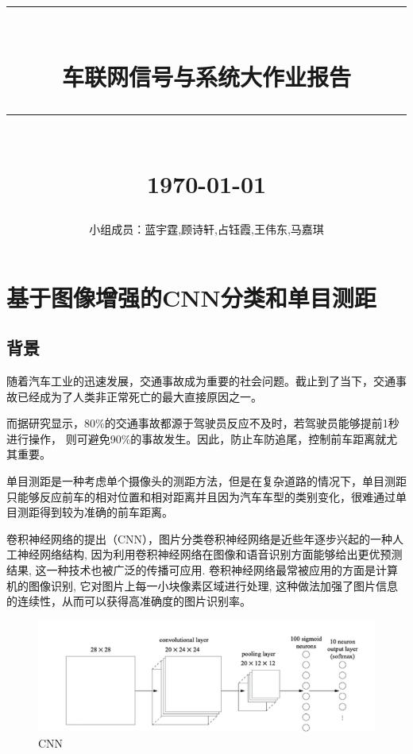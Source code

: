 \documentclass[12pt]{report}
\newcommand{\HRule}[1]{\rule{\linewidth}{#1}}
\begin{document}
\large

\title{ \normalsize \textsc{}
        \\ [2.0cm]
        \HRule{0.5pt} \\
        \LARGE \textbf{\uppercase{车联网信号与系统大作业报告}}
        \HRule{2pt} \\ [0.5cm]
        \normalsize \today \vspace*{5\baselineskip}}

\date{}

\author{
        小组成员：蓝宇霆,顾诗轩,占钰霞,王伟东,马嘉琪\\
        }

\maketitle
\tableofcontents
\newpage

\sectionfont{\scshape}


\section{基于图像增强的CNN分类和单目测距
}
\subsection{背景}
随着汽车工业的迅速发展，交通事故成为重要的社会问题。截止到了当下，交通事故已经成为了人类非正常死亡的最大直接原因之一。

而据研究显示，80\%的交通事故都源于驾驶员反应不及时，若驾驶员能够提前1秒进行操作，
则可避免90\%的事故发生。因此，防止车防追尾，控制前车距离就尤其重要。

单目测距是一种考虑单个摄像头的测距方法，但是在复杂道路的情况下，单目测距只能够反应前车的相对位置和相对距离并且因为汽车车型的类别变化，很难通过单目测距得到较为准确的前车距离。


卷积神经网络的提出（CNN），图片分类卷积神经网络是近些年逐步兴起的一种人工神经网络结构, 因为利用卷积神经网络在图像和语音识别方面能够给出更优预测结果, 这一种技术也被广泛的传播可应用. 卷积神经网络最常被应用的方面是计算机的图像识别, 它对图片上每一小块像素区域进行处理, 这种做法加强了图片信息的连续性，从而可以获得高准确度的图片识别率。

\begin{figure}[h]
  \centering
  \includegraphics[width=.8\textwidth]{1.png} %
  \caption{CNN} %
  \label{img} %
\end{figure}
\end{document}
